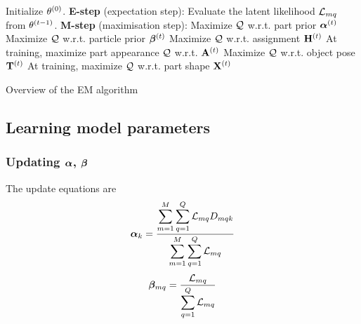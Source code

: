 \begin{algorithm} 
	\begin{algorithmic}
		\STATE Initialize $\theta^{(0)}$.
		\REPEAT
		\STATE \textbf{E-step} (expectation step): 
		\STATE \hspace{\algorithmicindent} Evaluate the latent likelihood $\mathcal{L}_{mq}$ from $\theta^{(t-1)}$.   
		\STATE \textbf{M-step} (maximisation step): 
		\STATE \hspace{\algorithmicindent} Maximize $\mathcal{Q}$ w.r.t. part prior $\bm{\alpha}^{(t)}$
		\STATE \hspace{\algorithmicindent} Maximize $\mathcal{Q}$ w.r.t. particle prior $\bm{\beta}^{(t)}$
		\STATE \hspace{\algorithmicindent} Maximize $\mathcal{Q}$ w.r.t. assignment $\mathbf{H}^{(t)}$
		\STATE \hspace{\algorithmicindent} At training, maximize part appearance $\mathcal{Q}$ w.r.t. $\mathbf{A}^{(t)}$ 
		\STATE \hspace{\algorithmicindent} Maximize $\mathcal{Q}$ w.r.t. object pose $\mathbf{T}^{(t)}$
		\STATE \hspace{\algorithmicindent} At training, maximize $\mathcal{Q}$ w.r.t. part shape $\mathbf{X}^{(t)}$
	\end{algorithmic}
	\caption{Overview of the EM algorithm}
	\label{algo/reg/em}
\end{algorithm} 

\subsection{Learning model parameters} 

\subsubsection{Updating $\bm{\alpha}$, $\bm{\beta}$}  The update equations are
\begin{equation}
\bm{\alpha}_{k} = \frac{\displaystyle\sum_{m=1}^M \sum_{q = 1}^{Q} \mathcal{L}_{mq}{D}_{mqk}}{\displaystyle\sum_{m=1}^M \sum_{q = 1}^{Q} \mathcal{L}_{mq}} 
\end{equation}
\begin{equation}
\bm{\beta}_{mq} = 
\frac{\mathcal{L}_{mq}}{\displaystyle\sum_{q = 1}^{Q} \mathcal{L}_{mq}}
\end{equation}

